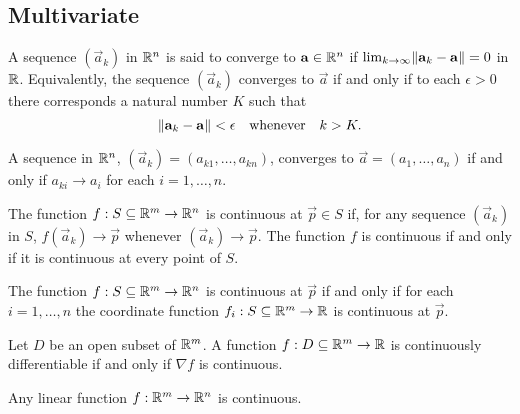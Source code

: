 \documentclass{article}
\begin{document}
\subsection{Multivariate}
\begin{definition}
    A sequence $(\vec{a}_k)$ in $\mathbb{R}^n$ is said to converge to $\mathbf{a} \in \mathbb{R}^n$
    if $\lim_{k \rightarrow \infty} \lVert\mathbf{a}_k - \mathbf{a}\rVert = 0$ in $\mathbb{R}$.
    Equivalently, the sequence $(\vec{a}_k)$ converges to $\vec{a}$ if and only if to
    each $\epsilon > 0$ there corresponds a natural number $K$ such that
    \begin{equation*}
        \lVert\mathbf{a}_k - \mathbf{a}\rVert < \epsilon \quad \textnormal{whenever} \quad k > K.
    \end{equation*}
\end{definition}

\begin{theorem}
    A sequence in $\mathbb{R}^n$, $(\vec{a}_k) = (a_{k1}, \ldots, a_{kn})$, converges to $\vec{a} = (a_1, \ldots, a_n)$ if and only if
    $a_{ki} \rightarrow a_i$ for each $i = 1,\ldots,n$.
\end{theorem}

\begin{definition}
    The function $f: S \subseteq \mathbb{R}^m \rightarrow \mathbb{R}^n$
    is continuous at $\vec{p} \in S$ if, for any sequence
    $(\vec{a}_k)$ in $S$, $f(\vec{a}_k) \rightarrow \vec{p}$ whenever
    $(\vec{a}_k) \rightarrow \vec{p}$. The function $f$ is continuous
    if and only if it is continuous at every point of $S$.
\end{definition}

\begin{theorem}
    The function $f: S \subseteq \mathbb{R}^m \rightarrow \mathbb{R}^n$
    is continuous at $\vec{p}$ if and only if for each $i=1, \ldots, n$ the coordinate function
    $f_i: S \subseteq \mathbb{R}^m \rightarrow \mathbb{R}$ is continuous at $\vec{p}$.
\end{theorem}

\begin{corollary}
    Let $D$ be an open subset of $\mathbb{R}^m$. A function $f: D \subseteq \mathbb{R}^m \rightarrow \mathbb{R}$
    is continuously differentiable if and only if $\nabla f$ is continuous.
\end{corollary}

\begin{corollary}
    Any linear function $f: \mathbb{R}^m \rightarrow \mathbb{R}^n$ is continuous.
\end{corollary}
\end{document}
